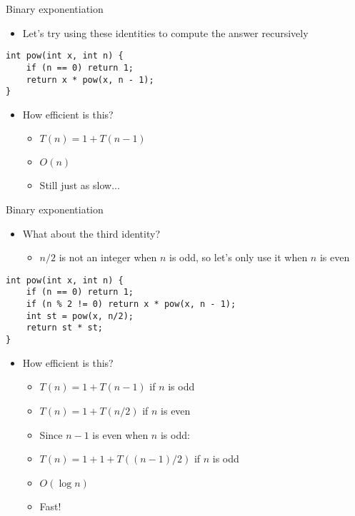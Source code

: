 \documentclass[12pt,t]{beamer}
\newcommand{\bi}{\begin{itemize}}
\newcommand{\ei}{\end{itemize}}
\begin{document}
\begin{frame}[fragile]{Binary exponentiation}
    \vspace{20pt}

    \bi
        \item Let's try using these identities to compute the answer recursively
    \ei

    \vspace{10pt}

    \begin{verbatim}
int pow(int x, int n) {
    if (n == 0) return 1;
    return x * pow(x, n - 1);
}
    \end{verbatim}

    \vspace{10pt}

    \bi
        \item<2-> How efficient is this?
            \bi
                \item $T(n) = 1 + T(n-1)$
                \item<3-> $O(n)$
                \item<4-> Still just as slow...
            \ei
    \ei

\end{frame}

\begin{frame}[fragile]{Binary exponentiation}
    \bi
        \item What about the third identity?
            \bi
                \item $n/2$ is not an integer when $n$ is odd, so let's only use it when $n$ is even
            \ei
    \ei

    \begin{verbatim}
int pow(int x, int n) {
    if (n == 0) return 1;
    if (n % 2 != 0) return x * pow(x, n - 1);
    int st = pow(x, n/2);
    return st * st;
}
    \end{verbatim}

    \bi
        \item How efficient is this?
            \bi
                \item<2-> $T(n) = 1 + T(n-1)$ if $n$ is odd
                \item<2-> $T(n) = 1 + T(n/2)$ if $n$ is even
                \item<3-> Since $n-1$ is even when $n$ is odd:
                \item<3-> $T(n) = 1 + 1 + T((n-1)/2)$ if $n$ is odd
                \item<4-> $O(\log n)$
                \item<4-> Fast!
            \ei
    \ei
\end{frame}
\end{document}
